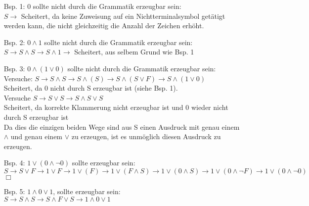\documentclass[11pt]{article}
\begin{document}
\begin{itemize}
\item[Bsp. 1:] $0$ sollte nicht durch die Grammatik erzeugbar sein:
\\$S\rightarrow$ Scheitert, da keine Zuweisung auf ein Nichtterminalsymbol getätigt werden kann, die nicht gleichzeitig die Anzahl der Zeichen erhöht.

\item[Bsp. 2:] $0\wedge 1$ sollte nicht durch die Grammatik erzeugbar sein:
\\$S\rightarrow S \wedge S \rightarrow S \wedge 1 \rightarrow$ Scheitert, aus selbem Grund wie Bsp. 1

\item[Bsp. 3:] $0\wedge (1\vee 0)$ sollte nicht durch die Grammatik erzeugbar sein:
\\Versuche: $S\rightarrow S\wedge S \rightarrow S \wedge (S)\rightarrow S \wedge (S\vee F)\rightarrow S \wedge (1\vee 0)$
\\Scheitert, da 0 nicht durch S erzeugbar ist (siehe Bsp. 1).
\\Versuche $S \rightarrow S \vee S \rightarrow S \wedge S \vee S$
\\Scheitert, da korrekte Klammerung nicht erzeugbar ist und 0 wieder nicht durch S erzeugbar ist
\\Da dies die einzigen beiden Wege sind aus S einen Ausdruck mit genau einem $\wedge$ und genau einem $\vee$ zu erzeugen, ist es unmöglich diesen Ausdruck zu erzeugen.

\item[Bsp. 4:] $1 \vee (0\wedge \neg 0)$ sollte erzeugbar sein:
\\$S \rightarrow S \vee F \rightarrow 1 \vee F \rightarrow 1 \vee (F) \rightarrow 1 \vee (F \wedge S) \rightarrow 1 \vee (0 \wedge S) \rightarrow 1 \vee (0 \wedge \neg F) \rightarrow 1 \vee (0\wedge \neg 0)$ \hfill $\Box$

\item[Bsp. 5:] $1 \wedge 0 \vee 1$, sollte erzeugbar sein:
\\$S \rightarrow S \wedge S \rightarrow S \wedge F \vee S \rightarrow 1 \wedge 0 \vee 1$

\end{itemize} 
\end{document}
